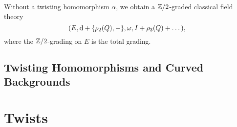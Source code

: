 \documentclass[10pt, oneside]{article}
\begin{document}
\begin{remark}
Without a twisting homomorphism $\alpha$, we obtain a $\mathbb Z/2$-graded classical field theory
\[(E, {\rm d} + \{\rho_2(Q), -\}, \omega, I + \rho_3(Q) + \dots),\]
where the $\mathbb Z/2$-grading on $E$ is the total grading.
\end{remark}

\subsection{Twisting Homomorphisms and Curved Backgrounds}


\section{Twists}

%
\end{document}
